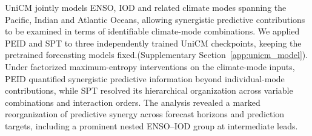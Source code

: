 \documentclass[fleqn,10pt]{wlscirep}
\theoremstyle{naturetheorem}
\begin{document}
UniCM jointly models ENSO, IOD and related climate modes spanning the Pacific, Indian and Atlantic Oceans, allowing synergistic predictive contributions to be examined in terms of identifiable climate-mode combinations. We applied PEID and SPT to three independently trained UniCM checkpoints, keeping the pretrained forecasting models fixed.(Supplementary Section~\ref{app:unicm_model}). Under factorized maximum-entropy interventions on the climate-mode inputs, PEID quantified synergistic predictive information beyond individual-mode contributions, while SPT resolved its hierarchical organization across variable combinations and interaction orders. The analysis revealed a marked reorganization of predictive synergy across forecast horizons and prediction targets, including a prominent nested ENSO–IOD group at intermediate leads.
\end{document}
